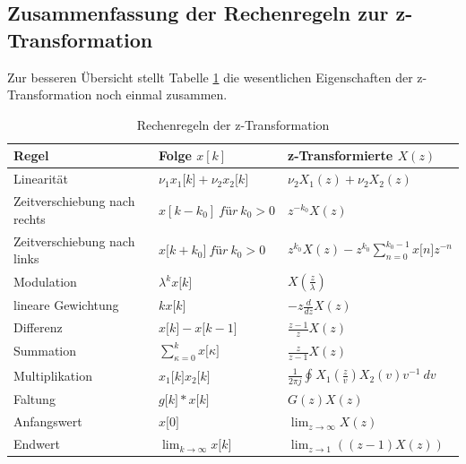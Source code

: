 \subsection{Zusammenfassung der Rechenregeln zur z-Transformation}\label{sec:zusammenfassung-der-rechenregeln-zur-z-transformation}

Zur besseren Übersicht stellt Tabelle \ref{tab:5.4} die wesentlichen Eigenschaften der z-Transformation noch einmal zusammen.

\begin{table}
  \centering
  \caption{Rechenregeln der z-Transformation}
  \label{tab:5.4}
  \begin{tabular}{lll}
    \toprule
    Regel & Folge \(x[k]\) & z-Transformierte \(X(z)\) \\
    \midrule
    Linearität & \(\nu_{1}  x_{1}\lbrack k\rbrack + \nu_{2}  x_{2}\lbrack k\rbrack\) & \(\nu_{2}  X_{1}(z) + \nu_{2}  X_{2}(z)\) \\
    Zeitverschiebung nach rechts & \(x\left\lbrack k - k_{0} \right\rbrack\ für\ k_{0} > 0\) & \(z^{- k_{0}}  X(z)\) \\
    Zeitverschiebung nach links & \(x\lbrack k + k_{0}\rbrack\ für\ k_{0} > 0\) & \(z^{k_{0}}  X(z) - z^{k_{0}}  \sum\limits_{n = 0}^{k_{0} - 1}{x\lbrack n\rbrack  z^{- n}}\) \\
    Modulation & \(\lambda^{k}  x\lbrack k\rbrack\) & \(X\left( \frac{z}{\lambda} \right)\) \\
    lineare Gewichtung & \(k  x\lbrack k\rbrack\) & \(- z  \frac{d}{dz}  X(z)\) \\
    Differenz & \(x\lbrack k\rbrack - x\lbrack k - 1\rbrack\) & \(\frac{z - 1}{z}  X(z)\) \\
    Summation & \(\sum\limits_{\kappa = 0}^{k}{x\lbrack\kappa\rbrack}\) & \(\frac{z}{z - 1}  X(z)\) \\
    Multiplikation & \(x_{1}\lbrack k\rbrack  x_{2}\lbrack k\rbrack\) & \(\frac{1}{2  \pi  j}  \oint_{}^{}{X_{1}\left( \frac{z}{v} \right)  X_{2}(v)  v^{- 1}\ dv}\) \\
    Faltung & \(g\lbrack k\rbrack*x\lbrack k\rbrack\) & \(G(z)  X(z)\) \\
    Anfangswert & \(x\lbrack 0\rbrack\) & \(\lim_{z \rightarrow \infty}X(z)\) \\
    Endwert & \(\lim_{k \rightarrow \infty}x\lbrack k\rbrack\) & \(\lim_{z \rightarrow 1}\left( (z - 1)  X(z) \right)\) \\
    \bottomrule
  \end{tabular}
\end{table}

